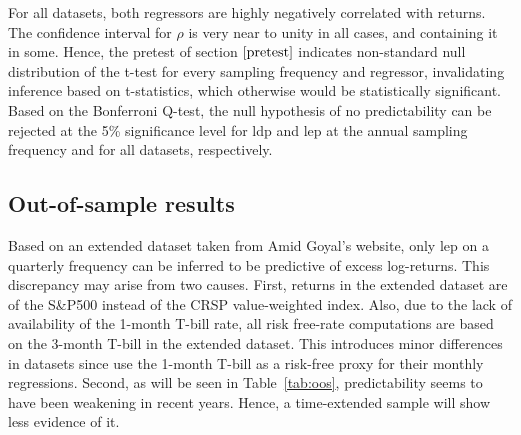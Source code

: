\documentclass[11pt, a4paper]{article}
\begin{document}
For all datasets, both regressors are highly negatively correlated with returns. The confidence interval for $\rho$ is very near to unity in all cases, and containing it in some. Hence, the pretest of section $\ref{pretest}$ indicates non-standard null distribution of the t-test for every sampling frequency and regressor, invalidating inference based on t-statistics, which otherwise would be statistically significant. Based on the Bonferroni Q-test, the null hypothesis of no predictability can be rejected at the 5\% significance level for ldp and lep at the annual sampling frequency and for all datasets, respectively. 
\subsection{Out-of-sample results}
Based on an extended dataset taken from Amid Goyal's website, only lep on a quarterly frequency can be inferred to be predictive of excess log-returns. This discrepancy may arise from two causes. First, returns in the extended dataset are of the S\&P500 instead of the CRSP value-weighted index. Also, due to the lack of availability of the 1-month T-bill rate, all risk free-rate computations are based on the 3-month T-bill in the extended dataset. This introduces minor differences in datasets since \citet{campbell2006efficient} use the 1-month T-bill as a risk-free proxy for their monthly regressions. Second, as will be seen in Table~\vref{tab:oos}, predictability seems to have been weakening in recent years. Hence, a time-extended sample will show less evidence of it.  
\end{document}
